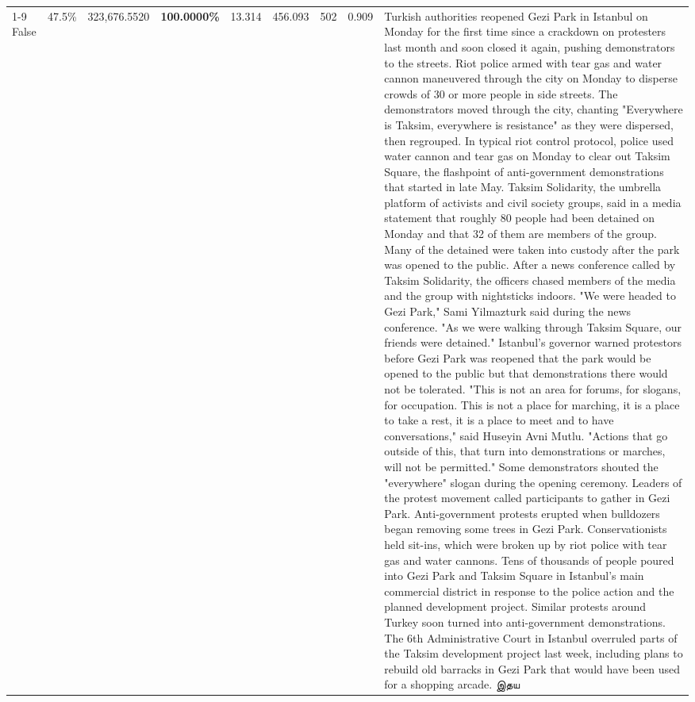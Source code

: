 \begin{table}[H]
\begin{tabular}{lllrlllll}
\cline{1-9}
False & 47.5\% & 323,676.5520 & \bfseries \color{red} 100.0000\% & 13.314 & 456.093 & 502 & 0.909 & Turkish authorities reopened Gezi Park in Istanbul on Monday for the first time since a crackdown on protesters last month and soon closed it again, pushing demonstrators to the streets. Riot police armed with tear gas and water cannon maneuvered through the city on Monday to disperse crowds of 30 or more people in side streets. The demonstrators moved through the city, chanting "Everywhere is Taksim, everywhere is resistance" as they were dispersed, then regrouped. In typical riot control protocol, police used water cannon and tear gas on Monday to clear out Taksim Square, the flashpoint of anti-government demonstrations that started in late May. Taksim Solidarity, the umbrella platform of activists and civil society groups, said in a media statement that roughly 80 people had been detained on Monday and that 32 of them are members of the group. Many of the detained were taken into custody after the park was opened to the public. After a news conference called by Taksim Solidarity, the officers chased members of the media and the group with nightsticks indoors. "We were headed to Gezi Park," Sami Yilmazturk said during the news conference. "As we were walking through Taksim Square, our friends were detained." Istanbul's governor warned protestors before Gezi Park was reopened that the park would be opened to the public but that demonstrations there would not be tolerated. "This is not an area for forums, for slogans, for occupation. This is not a place for marching, it is a place to take a rest, it is a place to meet and to have conversations," said Huseyin Avni Mutlu. "Actions that go outside of this, that turn into demonstrations or marches, will not be permitted." Some demonstrators shouted the "everywhere" slogan during the opening ceremony. Leaders of the protest movement called participants to gather in Gezi Park. Anti-government protests erupted when bulldozers began removing some trees in Gezi Park. Conservationists held sit-ins, which were broken up by riot police with tear gas and water cannons. Tens of thousands of people poured into Gezi Park and Taksim Square in Istanbul's main commercial district in response to the police action and the planned development project. Similar protests around Turkey soon turned into anti-government demonstrations. The 6th Administrative Court in Istanbul overruled parts of the Taksim development project last week, including plans to rebuild old barracks in Gezi Park that would have been used for a shopping arcade. இதய \\

\end{tabular}
\end{table}

